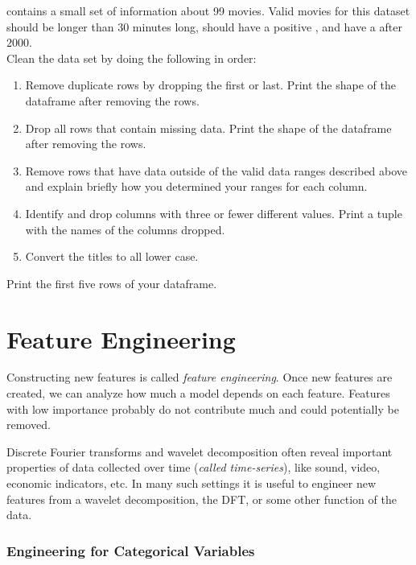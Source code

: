 \begin{problem}
 contains a small set of information about 99 movies. Valid movies for this dataset should be longer than $30$ minutes long, should have a positive , and have a  after $2000$.
\\

\noindent Clean the data set by doing the following in order: 

\begin{enumerate}

 \item Remove duplicate rows by dropping the first or last. Print the shape of the dataframe after removing the rows.

 \item Drop all rows that contain missing data. Print the shape of the dataframe after removing the rows.

 \item Remove rows that have data outside of the valid data ranges described above and explain briefly how you determined your ranges for each column.
 
 \item Identify and drop columns with three or fewer different values. Print a tuple with the names of the columns dropped.

 \item Convert the titles to all lower case.

\end{enumerate}
Print the first five rows of your dataframe.
\end{problem}

\section*{Feature Engineering}

Constructing new features is called \emph{feature engineering}.
Once new features are created, we can analyze how much a model depends on each feature. 
Features with low importance probably do not contribute much and could potentially be removed.

Discrete Fourier transforms and wavelet decomposition often reveal important properties of data collected over time (\emph{called time-series}), like sound, video, economic indicators, etc.  In many such settings it is useful to engineer new features from a  wavelet decomposition, the DFT, or some other function of the data.

\subsubsection{Engineering for Categorical Variables}

